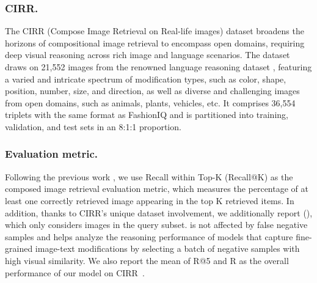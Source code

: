 \documentclass[letterpaper]{article} \usepackage{aaai24}  \usepackage{times}  \usepackage{helvet}  \usepackage{courier}  \usepackage[hyphens]{url}  \usepackage{graphicx} \urlstyle{rm} \def\UrlFont{\rm}  \usepackage{natbib}  \usepackage{caption} \frenchspacing  \setlength{\pdfpagewidth}{8.5in} \setlength{\pdfpageheight}{11in} \usepackage{amsmath,amsfonts}
\begin{document}
\subsubsection{CIRR.}
The CIRR (Compose Image Retrieval on Real-life images) dataset \cite{liu2021image} broadens the horizons of compositional image retrieval to encompass open domains, requiring deep visual reasoning across rich image and language scenarios.  The dataset draws on 21,552 images from the renowned language reasoning dataset , featuring a varied and intricate spectrum of modification types, such as color, shape, position, number, size, and direction, as well as diverse and challenging images from open domains, such as animals, plants, vehicles, etc.  It comprises 36,554 triplets with the same format as FashionIQ and is partitioned into training, validation, and test sets in an 8:1:1 proportion. 

\subsubsection{Evaluation metric.}
Following the previous work \cite{liu2021image, CLIP4Cir}, we use Recall within Top-K (Recall@K) as the composed image retrieval evaluation metric, which measures the percentage of at least one correctly retrieved image appearing in the top K retrieved items. In addition, thanks to CIRR's unique dataset involvement, we additionally report  (), which only considers images in the query subset.  is not affected by false negative samples and helps analyze the reasoning performance of models that capture fine-grained image-text modifications by selecting a batch of negative samples with high visual similarity. We also report the mean of R@5 and R as the overall performance of our model on CIRR~\cite{liu2021image}.
\end{document}
